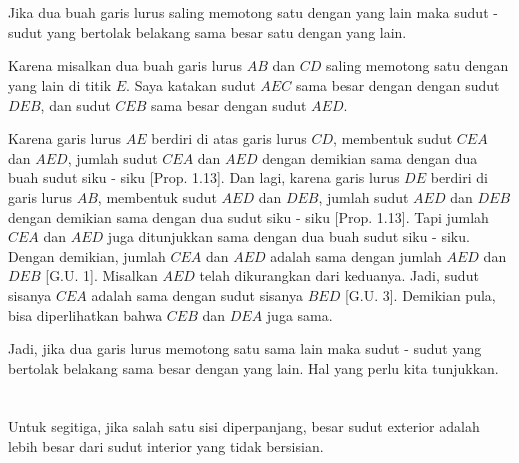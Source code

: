 \documentclass[a4paper]{book}
\begin{document}
\section*{\centering \thesection} 
Jika dua buah garis lurus saling memotong satu dengan yang lain maka sudut - 
sudut yang bertolak belakang  sama besar satu dengan yang lain.
\begin{center}
\end{center}
Karena misalkan dua buah garis lurus $AB$ dan $CD$ saling memotong satu dengan
yang lain di titik $E$. Saya katakan sudut $AEC$ sama besar dengan dengan 
sudut $DEB$, dan sudut $CEB$ sama besar dengan sudut $AED$.

Karena garis lurus $AE$ berdiri di atas garis lurus $CD$, membentuk sudut
$CEA$ dan $AED$, jumlah sudut $CEA$ dan $AED$ dengan demikian sama dengan
dua buah sudut siku - siku [Prop. 1.13]. Dan lagi, karena garis lurus $DE$ 
berdiri di garis lurus $AB$, membentuk sudut $AED$ dan $DEB$, jumlah sudut 
$AED$ dan $DEB$ dengan demikian sama dengan dua sudut siku - siku
[Prop. 1.13]. Tapi jumlah $CEA$ dan $AED$ juga ditunjukkan sama dengan dua 
buah sudut siku - siku. Dengan demikian, jumlah $CEA$ dan $AED$ adalah sama dengan
jumlah $AED$ dan $DEB$ [G.U. 1]. Misalkan $AED$ telah dikurangkan dari keduanya. 
Jadi, sudut sisanya $CEA$ adalah sama dengan sudut sisanya $BED$ [G.U. 3]. 
Demikian pula, bisa diperlihatkan bahwa $CEB$ dan $DEA$ juga sama.

Jadi, jika dua garis lurus memotong satu sama lain maka sudut - sudut yang 
bertolak belakang sama besar dengan yang lain. Hal yang perlu kita tunjukkan.

\section*{\centering \thesection} 
Untuk segitiga, jika salah satu sisi diperpanjang, besar sudut 
exterior adalah lebih besar dari sudut interior yang tidak bersisian.
\end{document}
